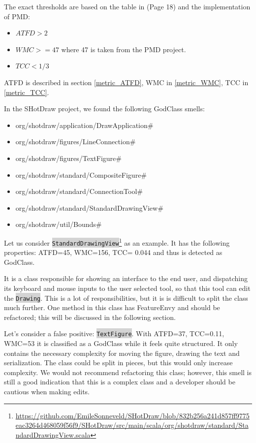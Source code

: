 \documentclass[onecolumn]{article}
\newcommand{\code}[1]{\colorbox{lightgray}{\texttt{#1}}}
\begin{document}
The exact thresholds are based on the table in \cite{lanza2007object}(Page 18) and the implementation of PMD:
\begin{itemize}
    \item $ATFD > 2$
    \item $WMC >= 47$ where 47 is taken from the PMD project.
    \item $TCC < 1/3$
\end{itemize}

ATFD is described in section \ref{metric_ATFD}, WMC in \ref{metric_WMC}, TCC in \ref{metric_TCC}.

In the SHotDraw project, we found the following GodClass smells:
\begin{itemize}
    \item org/shotdraw/application/DrawApplication\#
    \item org/shotdraw/figures/LineConnection\#
    \item org/shotdraw/figures/TextFigure\#
    \item org/shotdraw/standard/CompositeFigure\#
    \item org/shotdraw/standard/ConnectionTool\#
    \item org/shotdraw/standard/StandardDrawingView\#
    \item org/shotdraw/util/Bounds\#
\end{itemize}

Let us consider \code{StandardDrawingView}\footnote{\url{https://github.com/EmileSonneveld/SHotDraw/blob/832b256a241d857ff9775eac3264d468059f56f9/SHotDraw/src/main/scala/org/shotdraw/standard/StandardDrawingView.scala}} as an example. It has the following properties: ATFD=45, WMC=156, TCC= 0.044 and thus is detected as GodClass.

It is a class responsible for showing an interface to the end user, and dispatching its keyboard and mouse inputs to the user selected tool, so that this tool can edit the \code{Drawing}. This is a lot of responsibilities, but it is is difficult to split the class much further. One method in this class has FeatureEnvy and should be refactored; this will be discussed in the following section.

Let's consider a false positive: \code{TextFigure}. With ATFD=37, TCC=0.11, WMC=53 it is classified as a GodClass while it feels quite structured. It only contains the necessary complexity for moving the figure, drawing the text and serialization. The class could be split in pieces, but this would only increase complexity. We would not recommend refactoring this class; however, this smell is still a good indication that this is a complex class and a developer should be cautious when making edits.
\end{document}
